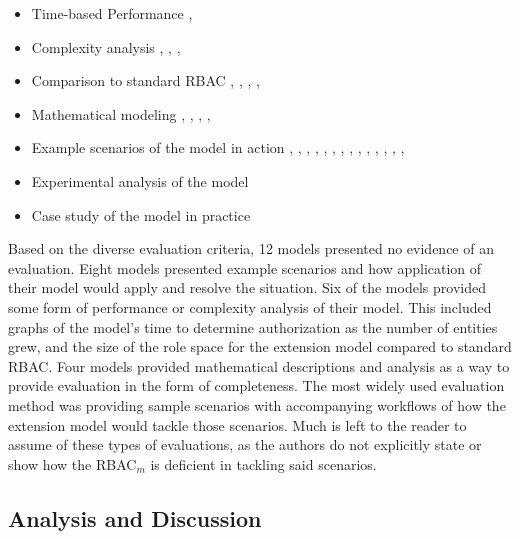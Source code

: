 \begin{itemize}
\setlength{\itemsep}{0.25pt}
\item Time-based Performance \cite{ni2010privacy}, \cite{aich09:role}
\item Complexity analysis \cite{bao08:role}, \cite{zhang06:collaborative}, \cite{chen08:spatio-temporal}, \cite{aich09:role}
\item Comparison to standard RBAC \cite{bao08:role}, \cite{zou2009crbac}, \cite{zhang06:collaborative}, \cite{zhao2008flexible}, \cite{ray07:spatio}
\item Mathematical modeling \cite{damian2007geo}, \cite{hansen2003spatial}, \cite{aich07:STARBAC}, \cite{chen08:spatio-temporal}, \cite{joshi05:generalized}
\item Example scenarios of the model in action \cite{alam06:constraint}, \cite{tzelepi01:flexible}, \cite{cholewka00:acontext-sensitive}, \cite{huang06:pervasive}, \cite{bao08:role}, \cite{jian2008extended}, \cite{yamazaki104:designing}, \cite{zou2009crbac}, \cite{ray07:spatio}, \cite{samuel07:spatio-temporal}, \cite{ray07:spatio}, \cite{joshi05:generalized}, \cite{yao2008task}, \cite{zhou2007team}, \cite{oh2003task}
\item Experimental analysis of the model
\item Case study of the model in practice \cite{motta03:contextual}
\end{itemize}

Based on the diverse evaluation criteria, 12 models presented no evidence of an evaluation. Eight models presented example scenarios
and how application of their model would apply and resolve the situation.  Six of the models provided some form of performance
or complexity analysis of their model.  This included graphs of the model's time to determine authorization as the number of entities
grew, and the size of the role space for the extension model compared to standard RBAC. Four models provided mathematical descriptions
and analysis as a way to provide evaluation in the form of completeness. 
The most widely used evaluation method was providing sample scenarios with accompanying workflows of how the extension model
would tackle those scenarios. Much is left to the reader to assume of these types of evaluations, as the authors do not explicitly state
or show how the RBAC$_{m}$ is deficient in tackling said scenarios.

\subsection{Analysis and Discussion}

